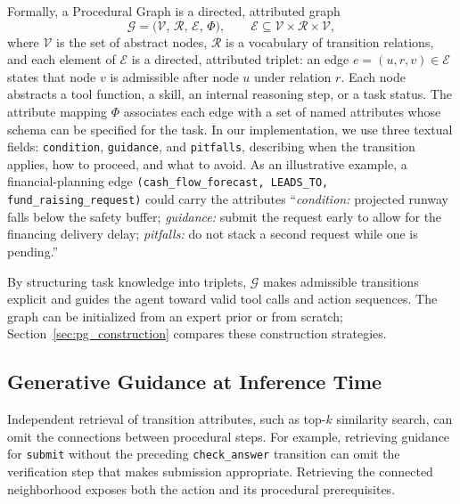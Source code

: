 Formally, a Procedural Graph is a directed, attributed graph
\begin{equation}
    \mathcal{G} = \big( \mathcal{V}, \, \mathcal{R}, \, \mathcal{E}, \, \Phi \big),
    \qquad
    \mathcal{E} \subseteq \mathcal{V} \times \mathcal{R} \times \mathcal{V},
\end{equation}
where $\mathcal{V}$ is the set of abstract nodes, $\mathcal{R}$ is a vocabulary of transition relations, and each element of $\mathcal{E}$ is a directed, attributed triplet: an edge $e = (u, r, v) \in \mathcal{E}$ states that node $v$ is admissible after node $u$ under relation $r$. Each node abstracts a tool function, a skill, an internal reasoning step, or a task status. The attribute mapping $\Phi$ associates each edge with a set of named attributes whose schema can be specified for the task. In our implementation, we use three textual fields: \texttt{condition}, \texttt{guidance}, and \texttt{pitfalls}, describing when the transition applies, how to proceed, and what to avoid. As an illustrative example, a financial-planning edge \texttt{(cash\_flow\_forecast, LEADS\_TO, fund\_raising\_request)} could carry the attributes ``\emph{condition:} projected runway falls below the safety buffer; \emph{guidance:} submit the request early to allow for the financing delivery delay; \emph{pitfalls:} do not stack a second request while one is pending.''

By structuring task knowledge into triplets, $\mathcal{G}$ makes admissible transitions explicit and guides the agent toward valid tool calls and action sequences. The graph can be initialized from an expert prior or from scratch; Section~\ref{sec:pg_construction} compares these construction strategies.

\subsection{Generative Guidance at Inference Time}
\label{subsec:online_guidance}

Independent retrieval of transition attributes, such as top-$k$ similarity search, can omit the connections between procedural steps. For example, retrieving guidance for \texttt{submit} without the preceding \texttt{check\_answer} transition can omit the verification step that makes submission appropriate. Retrieving the connected neighborhood exposes both the action and its procedural prerequisites.

